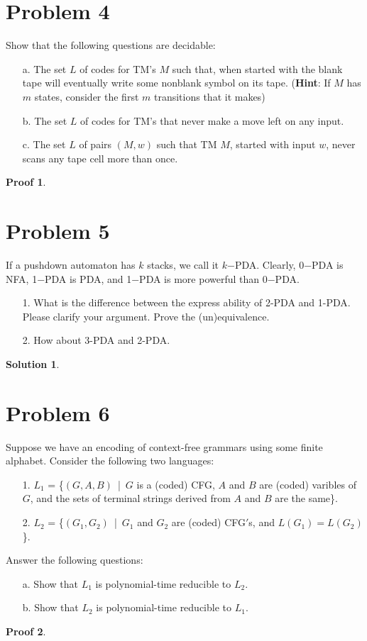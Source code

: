 \documentclass[a4paper,UTF8]{ctexart}
\theoremstyle{definition}
\newtheorem*{solution}{Solution}
\newtheorem*{prove}{Proof}
\begin{document}
\section*{Problem 4}
Show that the following questions are decidable:
\begin{enumerate}
  \item[a.] The set $L$ of codes for TM’s $M$ such that, when started with the blank tape will eventually write some nonblank symbol on its tape. (\textbf{Hint}: If $M$ has $m$ states, consider the first $m$ transitions that it makes)
  \item[b.] The set $L$ of codes for TM’s that never make a move left on any input.
  \item[c.] The set $L$ of pairs $(M,w)$ such that TM $M$, started with input $w$, never scans any tape cell more than once.
\end{enumerate}
\begin{prove}
\end{prove}
\newpage

\section*{Problem 5}
If a pushdown automaton has $k$ stacks, we call it $k$−PDA. Clearly, 0−PDA is NFA, 1−PDA is PDA, and 1−PDA is more powerful than 0−PDA.
\begin{enumerate}
  \item[1.] What is the difference between the express ability of 2-PDA and 1-PDA. Please clarify your argument. Prove the (un)equivalence.
  \item[2.] How about 3-PDA and 2-PDA.
\end{enumerate}
\begin{solution}
\end{solution}
\newpage

\section*{Problem 6}
Suppose we have an encoding of context-free grammars using some finite alphabet. Consider the following two languages:
\begin{enumerate}
  \item[1.] $L_1$ = \big\{$(G,A,B)$\ |\ $G$ is a (coded) CFG, $A$ and $B$ are (coded) varibles of $G$, and the sets of terminal strings derived from $A$ and $B$ are the same\big\}.
  \item[2.] $L_2$ = \big\{$(G_1,G_2)$\ |\ $G_1$ and $G_2$ are (coded) CFG$'$s, and $L(G_1) = L(G_2)$\big\}.
\end{enumerate}
Answer the following questions:
\begin{enumerate}
  \item[a.] Show that $L_1$ is polynomial-time reducible to $L_2$.
  \item[b.] Show that $L_2$ is polynomial-time reducible to $L_1$.
\end{enumerate}
\begin{prove}
\end{prove}
\newpage
\end{document}
